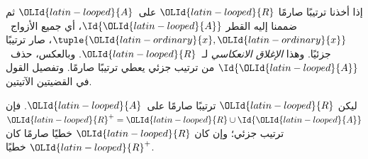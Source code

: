 \documentclass[../../../include/open-logic-section]{subfiles}
\begin{document}
إذا أخذنا ترتيبًا صارمًا ${\OLId{latin-looped}{R}}$ على~${\OLId{latin-looped}{A}}$ ثم ضممنا إليه القطر $\Id{{\OLId{latin-looped}{A}}}$،
أي جميع الأزواج~$\tuple{{\OLId{latin-ordinary}{x}}, {\OLId{latin-ordinary}{x}}}$، صار ترتيبًا جزئيًا. وهذا
\emph{الإغلاق الانعكاسي} لـ~${\OLId{latin-looped}{R}}$. وبالعكس، حذف~$\Id{{\OLId{latin-looped}{A}}}$ من ترتيب
جزئي يعطي ترتيبًا صارمًا. وتفصيل القول في القضيتين الآتيتين.

\begin{prop}
ليكن ${\OLId{latin-looped}{R}}$ ترتيبًا صارمًا على~${\OLId{latin-looped}{A}}$. فإن ${\OLId{latin-looped}{R}}^+ = {\OLId{latin-looped}{R}} \cup \Id{{\OLId{latin-looped}{A}}}$ ترتيب
جزئي؛ وإن كان ${\OLId{latin-looped}{R}}$ خطيًا صارمًا كان ${\OLId{latin-looped}{R}}^+$ خطيًا.
\end{prop}
\end{document}
